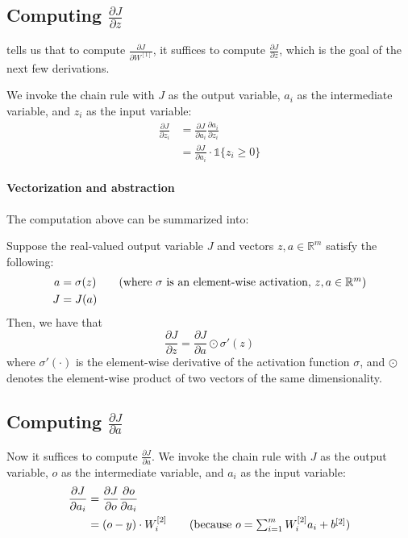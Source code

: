 \subsection{Computing $\frac{\partial J}{\partial z}$}
 tells us that to compute
$\frac{\partial J}{\partial W^{[1]}}$, it suffices
to compute
$\frac{\partial J}{\partial z}$, which is the goal of the next few derivations.

We invoke the chain rule with $J$ as the output variable, $a_i$ as the intermediate
variable, and $z_i$ as the input variable:
\begin{align*}
    \frac{\partial J}{\partial z_i} &= \frac{\partial J}{\partial a_i} \frac{\partial a_i}{\partial z_i}\\
        &=\frac{\partial J}{\partial a_i}\cdot \mathbb{1}\{z_i \ge 0\}
\end{align*}

\paragraph{Vectorization and abstraction} The computation above can be summarized
into:
\begin{claim}\label{cl:claim2}
    Suppose the real-valued output variable $J$ and vectors $z,a \in \mathbb{R}^m$
    satisfy the following:
    \begin{align*}
        a &= \sigma(z) \tag{where $\sigma$ is an element-wise activation, $z,a \in \mathbb{R}^m$}\\
        J &= J(a)
    \end{align*}
    Then, we have that
    \begin{equation*}
        \frac{\partial J}{\partial z} = \frac{\partial J}{\partial a} \odot \sigma'(z)\label{eq:elementwise}
    \end{equation*}
    where $\sigma'(\cdot)$ is the element-wise derivative of the activation function $\sigma$, and $\odot$
    denotes the element-wise product of two vectors of the same dimensionality.
\end{claim}

\subsection{Computing $\frac{\partial J}{\partial a}$}
Now it suffices to compute $\frac{\partial J}{\partial a}$. We invoke the chain rule
with $J$ as the output variable, $o$ as the intermediate variable, and $a_i$ as the
input variable:
\begin{align*}
    \frac{\partial J}{\partial a_i} &= \frac{\partial J}{\partial o} \frac{\partial o}{\partial a_i}\\
        &= (o - y) \cdot W^{[2]}_i \tag{because $o = \sum^m_{i=1} W^{[2]}_i a_i + b^{[2]}$}
\end{align*}

